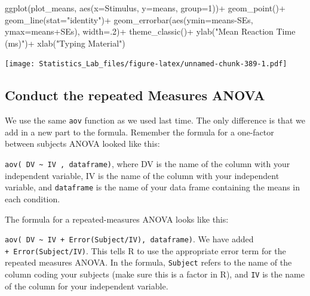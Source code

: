 \documentclass[
]{book}
\newenvironment{Shaded}{\begin{snugshade}}{\end{snugshade}}
\newcommand{\AttributeTok}[1]{\textcolor[rgb]{0.77,0.63,0.00}{#1}}
\newcommand{\DecValTok}[1]{\textcolor[rgb]{0.00,0.00,0.81}{#1}}
\newcommand{\FunctionTok}[1]{\textcolor[rgb]{0.00,0.00,0.00}{#1}}
\newcommand{\NormalTok}[1]{#1}
\newcommand{\SpecialCharTok}[1]{\textcolor[rgb]{0.00,0.00,0.00}{#1}}
\newcommand{\StringTok}[1]{\textcolor[rgb]{0.31,0.60,0.02}{#1}}
\begin{document}
\begin{Shaded}
\begin{Highlighting}[]
\FunctionTok{ggplot}\NormalTok{(plot\_means, }\FunctionTok{aes}\NormalTok{(}\AttributeTok{x=}\NormalTok{Stimulus, }\AttributeTok{y=}\NormalTok{means, }\AttributeTok{group=}\DecValTok{1}\NormalTok{))}\SpecialCharTok{+}
  \FunctionTok{geom\_point}\NormalTok{()}\SpecialCharTok{+}
  \FunctionTok{geom\_line}\NormalTok{(}\AttributeTok{stat=}\StringTok{"identity"}\NormalTok{)}\SpecialCharTok{+}
  \FunctionTok{geom\_errorbar}\NormalTok{(}\FunctionTok{aes}\NormalTok{(}\AttributeTok{ymin=}\NormalTok{means}\SpecialCharTok{{-}}\NormalTok{SEs, }\AttributeTok{ymax=}\NormalTok{means}\SpecialCharTok{+}\NormalTok{SEs), }\AttributeTok{width=}\NormalTok{.}\DecValTok{2}\NormalTok{)}\SpecialCharTok{+}
  \FunctionTok{theme\_classic}\NormalTok{()}\SpecialCharTok{+}
  \FunctionTok{ylab}\NormalTok{(}\StringTok{"Mean Reaction Time (ms)"}\NormalTok{)}\SpecialCharTok{+}
  \FunctionTok{xlab}\NormalTok{(}\StringTok{"Typing Material"}\NormalTok{)}
\end{Highlighting}
\end{Shaded}

\texttt{[image: Statistics\_Lab\_files/figure-latex/unnamed-chunk-389-1.pdf]}

\hypertarget{conduct-the-repeated-measures-anova}{%
\subsection{Conduct the repeated Measures ANOVA}\label{conduct-the-repeated-measures-anova}}

We use the same \texttt{aov} function as we used last time. The only difference is that we add in a new part to the formula. Remember the formula for a one-factor between subjects ANOVA looked like this:

\texttt{aov(\ DV\ \textasciitilde{}\ IV\ ,\ dataframe)}, where DV is the name of the column with your independent variable, IV is the name of the column with your independent variable, and \texttt{dataframe} is the name of your data frame containing the means in each condition.

The formula for a repeated-measures ANOVA looks like this:

\texttt{aov(\ DV\ \textasciitilde{}\ IV\ +\ Error(Subject/IV),\ dataframe)}. We have added \texttt{+\ Error(Subject/IV)}. This tells R to use the appropriate error term for the repeated measures ANOVA. In the formula, \texttt{Subject} refers to the name of the column coding your subjects (make sure this is a factor in R), and \texttt{IV} is the name of the column for your independent variable.
\end{document}
